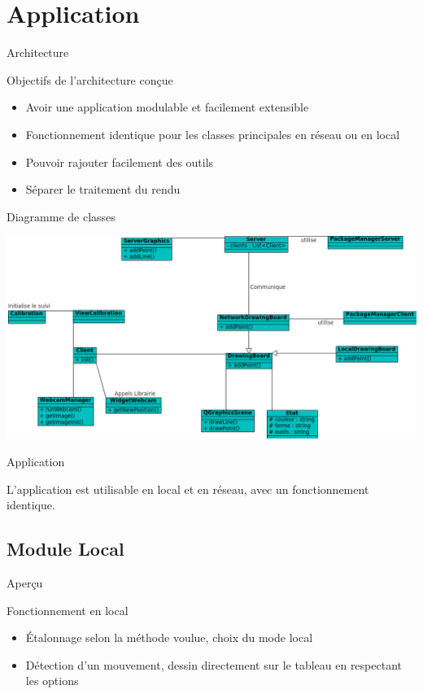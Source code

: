\documentclass{beamer}
\begin{document}
	
	\section{Application}
		\begin{frame}{Architecture}
			\begin{block}{Objectifs de l'architecture conçue}
				\begin{itemize}
				\item{Avoir une application modulable et facilement extensible}
				\item{Fonctionnement identique pour les classes principales en réseau ou en local}
				\item{Pouvoir rajouter facilement des outils}
				\item{Séparer le traitement du rendu}
				\end{itemize}
			\end{block}
		\end{frame}
		
		\begin{frame}{Diagramme de classes}
			\begin{center}		
			\includegraphics[scale=0.45]{../uml/classes.png}
			\end{center}
		\end{frame}
		
		\begin{frame}{Application}
			
			L'application est utilisable en local et en réseau, avec un fonctionnement identique.
			
		\end{frame}
		
	\subsection{Module Local}
		\begin{frame}{Aperçu}
			\begin{block}{Fonctionnement en local}
				\begin{itemize}
				\item Étalonnage selon la méthode voulue, choix du mode local
				\item Détection d'un mouvement, dessin directement sur le tableau en respectant les options
				\end{itemize}
			\end{block}
		\end{frame}
		
\end{document}
